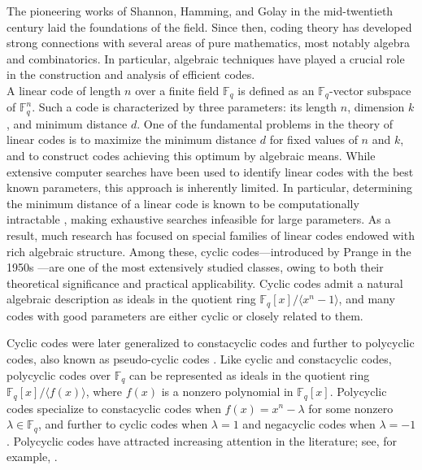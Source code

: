 \documentclass[12pt]{elsarticle}
\newcommand{\Fq}{\mathbb{F}_{q}}
\theoremstyle{break}
{\theorembodyfont{\upshape}
    \newtheorem{theorem}{Theorem}[section] %
    \newtheorem{lemma}[theorem]{Lemma} %
    \newtheorem{proposition}[theorem]{Proposition}
    \newtheorem{corollary}[theorem]{Corollary}
    \newtheorem{definition}[theorem]{Definition}
    \newtheorem{example}[theorem]{Example}
    \newtheorem{remark}[theorem]{Remark}
    \newtheorem{conjecture}[theorem]{Conjecture}
    \newtheorem*{proof}{{Proof}}
	\newtheorem*{notation}{Notation}
	\newtheorem*{main}{Cain Theorem}
	\newtheorem*{problem}{Problem}
}
\begin{document}
The pioneering works of Shannon, Hamming, and Golay in the mid-twentieth century \cite{Shannon1948,hamming1950error,golay1949notes} laid the foundations of the field. Since then, coding theory has developed strong connections with several areas of pure mathematics, most notably algebra and combinatorics. In particular, algebraic techniques have played a crucial role in the construction and analysis of efficient codes.\\
A linear code of length $n$ over a finite field $\Fq$ is defined as an $\Fq$-vector subspace of $\Fq^n$. Such a code is characterized by three parameters: its length $n$, dimension $k$, and minimum distance $d$. One of the fundamental problems in the theory of linear codes is to maximize the minimum distance $d$ for fixed values of $n$ and $k$, and to construct codes achieving this optimum by algebraic means. 
While extensive computer searches have been used to identify linear codes with the best known parameters, this approach is inherently limited. In particular, determining the minimum distance of a linear code is known to be computationally intractable \cite{vardy2002intractability}, making exhaustive searches infeasible for large parameters. As a result, much research has focused on special families of linear codes endowed with rich algebraic structure. 
Among these, cyclic codes—introduced by Prange in the 1950s \cite{Prange1957}—are one of the most extensively studied classes, owing to both their theoretical significance and practical applicability. Cyclic codes admit a natural algebraic description as ideals in the quotient ring $\Fq[x]/\langle x^n - 1 \rangle$, and many codes with good parameters are either cyclic or closely related to them. 

Cyclic codes were later generalized to constacyclic codes \cite{Berlekamp1968} and further to polycyclic codes, also known as pseudo-cyclic codes \cite{10}. 
Like cyclic and constacyclic codes, polycyclic codes over $\Fq$ can be represented as ideals in the quotient ring $\Fq[x]/\langle f(x) \rangle$, where $f(x)$ is a nonzero polynomial in $\Fq[x]$. Polycyclic codes specialize to constacyclic codes when $f(x) = x^n - \lambda$ for some nonzero $\lambda \in \Fq$, and further to cyclic codes when $\lambda = 1$ and negacyclic codes when $\lambda = -1$. Polycyclic codes have attracted increasing attention in the literature; see, for example, \cite{Aydin2022,12,Ouazzou2021,Shi2020,Shi2023}.
\end{document}
